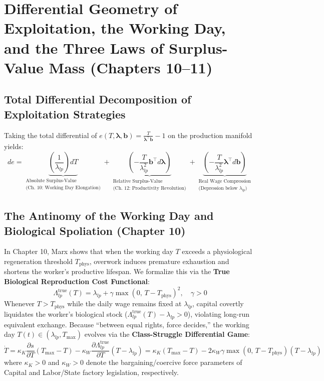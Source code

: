 \documentclass[11pt,a4paper]{article}
\begin{document}
\section{Differential Geometry of Exploitation, the Working Day, and the Three Laws of Surplus-Value Mass (Chapters 10--11)}

\subsection{Total Differential Decomposition of Exploitation Strategies}

Taking the total differential of $e(T, \boldsymbol{\lambda}, \mathbf{b}) = \frac{T}{\boldsymbol{\lambda}^\top \mathbf{b}} - 1$ on the production manifold yields:
\begin{equation}
    de = \underbrace{\left(\frac{1}{\lambda_{lp}}\right) dT}_{\substack{\text{Absolute Surplus-Value} \\ \text{(Ch. 10: Working Day Elongation)}}} + \underbrace{\left(-\frac{T}{\lambda_{lp}^2} \mathbf{b}^\top d\boldsymbol{\lambda}\right)}_{\substack{\text{Relative Surplus-Value} \\ \text{(Ch. 12: Productivity Revolution)}}} + \underbrace{\left(-\frac{T}{\lambda_{lp}^2} \boldsymbol{\lambda}^\top d\mathbf{b}\right)}_{\substack{\text{Real Wage Compression} \\ \text{(Depression below } \lambda_{lp}\text{)}}}
\end{equation}

\subsection{The Antinomy of the Working Day and Biological Spoliation (Chapter 10)}

In Chapter 10, Marx shows that when the working day $T$ exceeds a physiological regeneration threshold $T_{\text{phys}}$, overwork induces premature exhaustion and shortens the worker's productive lifespan. We formalize this via the \textbf{True Biological Reproduction Cost Functional}:
\begin{equation}
    \Lambda_{lp}^{\text{true}}(T) = \lambda_{lp} + \gamma \max\!\left(0, \, T - T_{\text{phys}}\right)^2, \quad \gamma > 0
\end{equation}
Whenever $T > T_{\text{phys}}$ while the daily wage remains fixed at $\lambda_{lp}$, capital covertly liquidates the worker's biological stock ($\Lambda_{lp}^{\text{true}}(T) - \lambda_{lp} > 0$), violating long-run equivalent exchange. Because ``between equal rights, force decides,'' the working day $T(t) \in (\lambda_{lp}, T_{\max})$ evolves via the \textbf{Class-Struggle Differential Game}:
\begin{equation}
    \dot{T} = \kappa_K \frac{\partial s}{\partial T} (T_{\max} - T) - \kappa_W \frac{\partial \Lambda_{lp}^{\text{true}}}{\partial T} (T - \lambda_{lp}) = \kappa_K (T_{\max} - T) - 2 \kappa_W \gamma \max\!\left(0, \, T - T_{\text{phys}}\right)(T - \lambda_{lp})
\end{equation}
where $\kappa_K > 0$ and $\kappa_W > 0$ denote the bargaining/coercive force parameters of Capital and Labor/State factory legislation, respectively.
\end{document}
